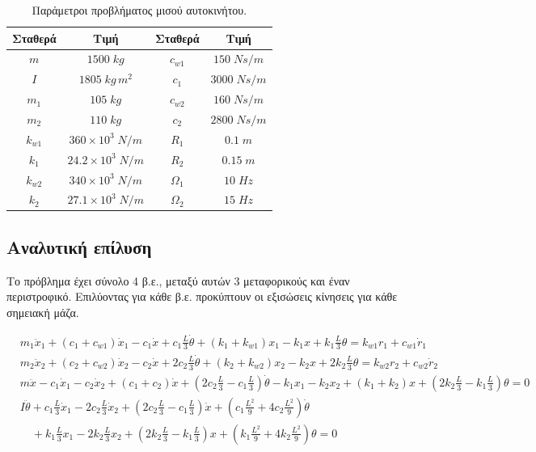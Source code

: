 \documentclass{article}
\begin{document}
\begin{table}[H]
    \centering
    \begin{tabular}{|c|c|c|c|}
        \hline
        \rowcolor{Dandelion}
        Σταθερά & Τιμή & Σταθερά & Τιμή \\
        \hline
        $m$ & $1500\; kg$ & $c_{w1}$ & $150\; Ns/m$ \\
        \hline
        $I$ & $1805\; kg\,m^2$ & $c_{1}$ & $3000\; Ns/m$ \\
        \hline
        $m_1$ & $105\; kg$ & $c_{w2}$ & $160\; Ns/m$ \\
        \hline
        $m_2$ & $110\; kg$ & $c_{2}$ & $2800\; Ns/m$ \\
        \hline
        $k_{w1}$ & $360\times10^3\; N/m$ & $R_1$ & $0.1\; m$ \\
        \hline
        $k_{1}$ & $24.2\times10^3\; N/m$ & $R_2$ & $0.15\; m$ \\
        \hline
        $k_{w2}$ & $340\times10^3\; N/m$ & $\Omega_1$ & $10\; Hz$ \\
        \hline
        $k_{2}$ & $27.1\times10^3\; N/m$ & $\Omega_2$ & $15\; Hz$ \\
        \hline
    \end{tabular}
    \caption{Παράμετροι προβλήματος μισού αυτοκινήτου.}
    \label{tab:const}
\end{table}





\subsection{Αναλυτική επίλυση}
Το πρόβλημα έχει σύνολο 4 β.ε., μεταξύ αυτών 3 μεταφορικούς και έναν περιστροφικό. Επιλύοντας για κάθε β.ε. προκύπτουν οι εξισώσεις κίνησεις για κάθε σημειακή μάζα.

\begin{equation}
\begin{aligned}
    &m_1\ddot{x}_1 + (c_1 + c_{w1})\dot{x}_1 - c_1\dot{x} + c_1\frac{L}{3}\dot{\theta} + (k_1 + k_{w1})x_1 - k_1x + k_1\frac{L}{3}\theta = k_{w1}r_1 + c_{w1}\dot{r}_1 \\
    &m_2\ddot{x}_2 + (c_2 + c_{w2})\dot{x}_2 - c_2\dot{x} + 2c_2\frac{L}{3}\dot{\theta} + (k_2 + k_{w2})x_2 - k_2x + 2k_2\frac{L}{3}\theta = k_{w2}r_2 + c_{w2}\dot{r}_2 \\
    &m\ddot{x} - c_1\dot{x}_1 - c_2\dot{x}_2 + (c_1 + c_2)\dot{x} + \left(2c_2\frac{L}{3} - c_1\frac{L}{3}\right)\dot{\theta} - k_1x_1 - k_2x_2 + (k_1 + k_2)x + \left(2k_2\frac{L}{3} - k_1\frac{L}{3}\right)\theta = 0 \\
    &I\ddot{\theta} + c_1\frac{L}{3}\dot{x}_1 - 2c_2\frac{L}{3}\dot{x}_2 + \left(2c_2\frac{L}{3} - c_1\frac{L}{3}\right)\dot{x} + \left(c_1\frac{L^2}{9} + 4c_2\frac{L^2}{9}\right)\dot{\theta} \\
    &\quad + k_1\frac{L}{3}x_1 - 2k_2\frac{L}{3}x_2 + \left(2k_2\frac{L}{3} - k_1\frac{L}{3}\right)x + \left(k_1\frac{L^2}{9} + 4k_2\frac{L^2}{9}\right)\theta = 0
\end{aligned}
\end{equation}
\end{document}

